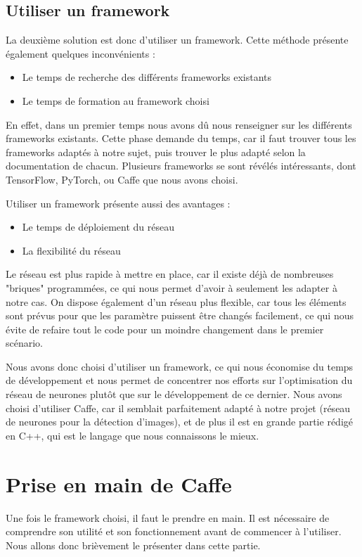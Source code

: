 \documentclass[a4paper,12pt]{article}
\begin{document}
  \subsection{Utiliser un framework}
    La deuxième solution est donc d'utiliser un framework. Cette méthode présente également quelques inconvénients : 
    \begin{itemize}
      \item Le temps de recherche des différents frameworks existants
      \item Le temps de formation au framework choisi
    \end{itemize}

    En effet, dans un premier temps nous avons dû nous renseigner sur les différents frameworks existants. Cette phase demande du temps, car il faut trouver tous les frameworks adaptés à notre sujet, puis trouver le plus adapté selon la documentation de chacun. Plusieurs frameworks se sont révélés intéressants, dont TensorFlow, PyTorch, ou Caffe que nous avons choisi.

    Utiliser un framework présente aussi des avantages :
    \begin{itemize}
      \item Le temps de déploiement du réseau
      \item La flexibilité du réseau
    \end{itemize}

    Le réseau est plus rapide à mettre en place, car il existe déjà de nombreuses "briques" programmées, ce qui nous permet d'avoir à seulement les adapter à notre cas. On dispose également d'un réseau plus flexible, car tous les éléments sont prévus pour que les paramètre puissent être changés facilement, ce qui nous évite de refaire tout le code pour un moindre changement dans le premier scénario.

    Nous avons donc choisi d'utiliser un framework, ce qui nous économise du temps de développement et nous permet de concentrer nos efforts sur l'optimisation du réseau de neurones plutôt que sur le développement de ce dernier. Nous avons choisi d'utiliser Caffe, car il semblait parfaitement adapté à notre projet (réseau de neurones pour la détection d'images), et de plus il est en grande partie rédigé en C++, qui est le langage que nous connaissons le mieux.

\newpage
\section{Prise en main de Caffe}
  Une fois le framework choisi, il faut le prendre en main. Il est nécessaire de comprendre son utilité et son fonctionnement avant de commencer à l'utiliser. Nous allons donc brièvement le présenter dans cette partie.
  
\end{document}
